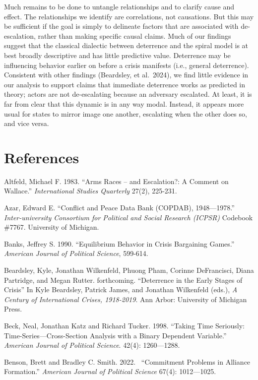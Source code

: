 \documentclass[
  letterpaper,
  DIV=11,
  numbers=noendperiod]{scrartcl}
\begin{document}
Much remains to be done to untangle relationships and to clarify cause
and effect. The relationships we identify are correlations, not
causations. But this may be sufficient if the goal is simply to
delineate factors that are associated with de-escalation, rather than
making specific causal claims. Much of our findings suggest that the
classical dialectic between deterrence and the spiral model is at best
broadly descriptive and has little predictive value. Deterrence may be
influencing behavior earlier on before a crisis manifests (i.e., general
deterrence). Consistent with other findings (Beardsley, et al.~2024), we
find little evidence in our analysis to support claims that immediate
deterrence works as predicted in theory; actors are not de-escalating
because an adversary escalated. At least, it is far from clear that this
dynamic is in any way modal. Instead, it appears more usual for states
to mirror image one another, escalating when the other does so, and vice
versa.

\section{References}\label{references}

Altfeld, Michael F. 1983. ``Arms Races -- and Escalation?: A Comment on
Wallace.'' \emph{International Studies Quarterly} 27(2), 225-231.

Azar, Edward E. ``Conflict and Peace Data Bank (COPDAB), 1948---1978.''
\emph{Inter-university Consortium for Political and Social Research
(ICPSR)} Codebook \#7767. University of Michigan.

Banks, Jeffrey S. 1990. ``Equilibrium Behavior in Crisis Bargaining
Games.'' \emph{American Journal of Political Science}, 599-614.

Beardsley, Kyle, Jonathan Wilkenfeld, Phuong Pham, Corinne DeFrancisci,
Diana Partridge, and Megan Rutter. forthcoming. ``Deterrence in the
Early Stages of Crisis'' In Kyle Beardsley, Patrick James, and Jonathan
Wilkenfeld (eds.), \emph{A Century of International Crises, 1918-2019}.
Ann Arbor: University of Michigan Press.

Beck, Neal, Jonathan Katz and Richard Tucker. 1998. ``Taking Time
Seriously:~ Time-Series---Cross-Section Analysis with a Binary Dependent
Variable.'' \emph{American Journal of Political Science}. 42(4):
1260---1288.~

Benson, Brett and Bradley C. Smith. 2022.~ ``Commitment Problems in
Alliance Formation.'' \emph{American Journal of Political Science}
67(4): 1012---1025.
\end{document}
